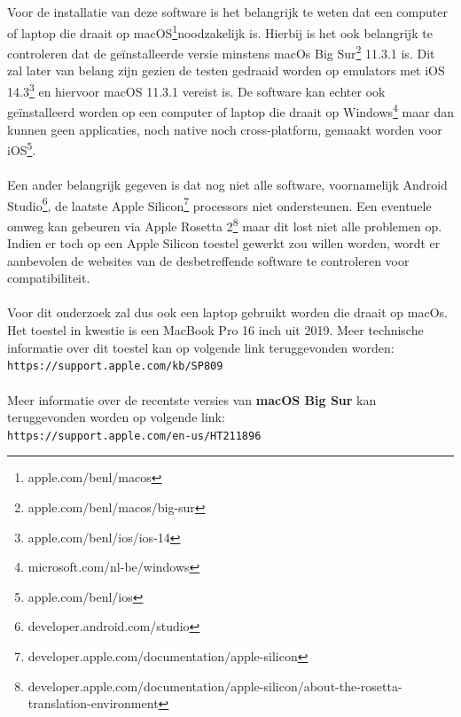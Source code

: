    \subsection{}
    \label{sec:I-hardware}
    Voor de installatie van deze software is het belangrijk te weten dat een computer of laptop die draait op macOS\footnote{apple.com/benl/macos}noodzakelijk is. Hierbij is het ook belangrijk te controleren dat de geïnstalleerde versie minstens macOs Big Sur\footnote{apple.com/benl/macos/big-sur} 11.3.1 is. Dit zal later van belang zijn gezien de testen gedraaid worden op emulators met  iOS 14.3\footnote{apple.com/benl/ios/ios-14} en hiervoor macOS 11.3.1 vereist is. De software kan echter ook geïnstalleerd worden op een computer of laptop die draait op Windows\footnote{microsoft.com/nl-be/windows} maar dan kunnen geen applicaties, noch native noch cross-platform, gemaakt worden voor iOS\footnote{apple.com/benl/ios}.
    \\ \\
    Een ander belangrijk gegeven is dat nog niet alle software, voornamelijk Android Studio\footnote{developer.android.com/studio}, de laatste Apple Silicon\footnote{developer.apple.com/documentation/apple-silicon} processors niet ondersteunen. Een eventuele omweg kan gebeuren via Apple Rosetta 2\footnote{developer.apple.com/documentation/apple-silicon/about-the-rosetta-translation-environment} maar dit lost niet alle problemen op. Indien er toch op een Apple Silicon toestel gewerkt zou willen worden, wordt er aanbevolen de websites van de desbetreffende software te controleren voor compatibiliteit.  
    \\ \\
    Voor dit onderzoek zal dus ook een laptop gebruikt worden die draait op macOs. Het toestel in kwestie is een MacBook Pro 16 inch uit 2019.
    Meer technische informatie over dit toestel kan op volgende link teruggevonden worden:\\
    \verb*|https://support.apple.com/kb/SP809|
    \\ \\
    Meer informatie over de recentste versies van \textbf{macOS Big Sur} kan teruggevonden worden op volgende link:\\
    \verb*|https://support.apple.com/en-us/HT211896|

